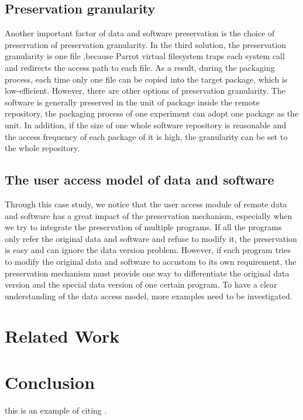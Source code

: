 \documentclass{acm_proc_article-sp}
\begin{document}
\subsection{Preservation granularity}
Another important factor of data and software preservation is the choice of preservation of preservation granularity. In the third solution, the preservation granularity is one file ,because Parrot virtual filesystem traps each system call and redirects the access path to each file. As a result, during the packaging process, each time only one file can be copied into the target package, which is low-efficient. However, there are other options of preservation granularity. The software is generally preserved in the unit of package inside the remote repository, the packaging process of one experiment can adopt one package as the unit. In addition, if the size of one whole software repository is reasonable and the access frequency of each package of it is high, the granularity can be set to the whole repository.

\subsection{The user access model of data and software}
Through this case study, we notice that the user access module of remote data and software has a great impact of the preservation mechanism, especially when we try to integrate the preservation of multiple programs. If all the programs only refer the original data and software and refuse to modify it, the preservation is easy and can ignore the data version problem. However, if each program tries to modify the original data and software to accustom to its own requirement, the preservation mechanism must provide one way to differentiate the original data version and the special data version of one certain program. To have a clear understanding of the data access model, more examples need to be investigated.

\section{Related Work }

\section{Conclusion}

this is an example of citing \cite{Laboratories79make}. 



\end{document}
